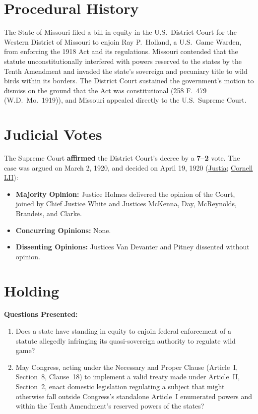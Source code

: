\documentclass[12pt]{article}
\begin{document}
\section{Procedural History}
The State of Missouri filed a bill in equity in the U.S.\ District Court for the Western District of Missouri to enjoin Ray P.\ Holland, a U.S.\ Game Warden, from enforcing the 1918 Act and its regulations. Missouri contended that the statute unconstitutionally interfered with powers reserved to the states by the Tenth Amendment and invaded the state's sovereign and pecuniary title to wild birds within its borders. The District Court sustained the government's motion to dismiss on the ground that the Act was constitutional (258 F.\ 479 (W.D.\ Mo.\ 1919)), and Missouri appealed directly to the U.S.\ Supreme Court.

\section{Judicial Votes}
The Supreme Court \textbf{affirmed} the District Court's decree by a \textbf{7--2} vote. The case was argued on March 2, 1920, and decided on April 19, 1920 (\href{https://supreme.justia.com/cases/federal/us/252/416/}{Justia}; \href{https://www.law.cornell.edu/supremecourt/text/252/416}{Cornell LII}):

\begin{itemize}
    \item \textbf{Majority Opinion:} Justice Holmes delivered the opinion of the Court, joined by Chief Justice White and Justices McKenna, Day, McReynolds, Brandeis, and Clarke.
    \item \textbf{Concurring Opinions:} None.
    \item \textbf{Dissenting Opinions:} Justices Van Devanter and Pitney dissented without opinion.
\end{itemize}

\section{Holding}
\textbf{Questions Presented:}

\begin{enumerate}
  \item Does a state have standing in equity to enjoin federal enforcement of a statute allegedly infringing its quasi-sovereign authority to regulate wild game?
  \item May Congress, acting under the Necessary and Proper Clause (Article~I, Section~8, Clause~18) to implement a valid treaty made under Article~II, Section~2, enact domestic legislation regulating a subject that might otherwise fall outside Congress's standalone Article~I enumerated powers and within the Tenth Amendment's reserved powers of the states?
\end{enumerate}
\end{document}
